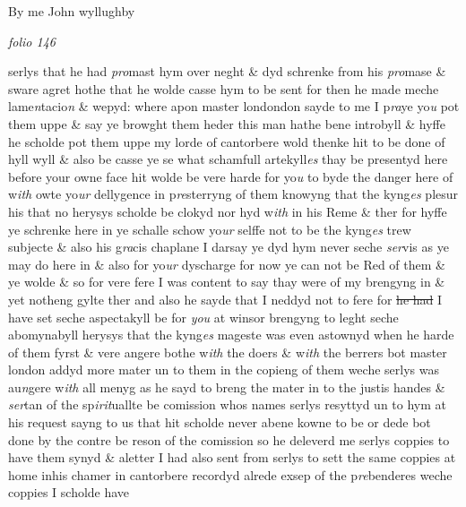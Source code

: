 \documentclass[12pt, a4paper]{book}
\begin{document}
		\ifthenelse{\isodd{\thepage}}
		{\reversemarginpar}
		{\normalmarginpar}
		By me John wyllughby

\dotfill
					

\textit{folio 146}



		\ifthenelse{\isodd{\thepage}}
		{\reversemarginpar}
		{\normalmarginpar}
		serlys that he had \textit{pro}mast hym over neght \& dyd schrenke from
 his \textit{pro}mase \& sware agret hothe that he wolde casse hym to be
 sent for then he made meche lame\textit{n}tacio\textit{n} \& wepyd: where apon
	master londondon sayde to me I p\textit{ra}ye yo\textit{u} pot them uppe \& say
 ye browght them heder this man hathe bene introbyll
 \& hyffe he scholde pot them uppe my lorde of cantorbere wold
 thenke hit to be done of hyll wyll \& also be casse ye se what
 schamfull artekyll\textit{es} thay be
			 presentyd here before your owne face
 hit wolde be vere harde for yo\textit{u} to byde the danger here of w\textit{ith}
 owte yo\textit{ur} dellygence in p\textit{re}sterryng of them knowyng that the
 kyng\textit{es }plesur his that no herysys scholde be clokyd nor hyd w\textit{ith} in
 his Reme \& ther for hyffe ye schrenke here in ye schalle schow
 yo\textit{ur} selffe not to be the kyng\textit{es} trew subjecte \& also his g\textit{ra}cis
 chaplane I darsay ye dyd hym never seche \textit{ser}vis as ye may
 do here in \& also for yo\textit{ur} dyscharge for now ye can not be Red
 of them \& ye wolde \& so for vere fere I was content to say
 thay were of my brengyng in \& yet notheng gylte ther
 and also he sayde that I neddyd not to fere for \sout{he had} I have
			 set seche
 aspectakyll be for \textit{you} at winsor brengyng to leght seche
 abomynabyll herysys that the kyng\textit{es} mageste was even
 astownyd when he harde of them fyrst \& vere angere bothe
 w\textit{ith} the doers \& w\textit{ith} the berrers bot master london addyd more
 mater un to them in the copieng of them weche serlys
 was au\textit{n}gere w\textit{ith} all menyg as he sayd to breng the
 mater in to the justis handes \& \textit{ser}tan of the sp\textit{irit}uallte
 be comission whos names serlys resyttyd un to hym at
 his request sayng to us that hit scholde never abene
 kowne to be or dede bot done by the contre be reson of
 the comission so he deleverd me serlys coppies to have them
 synyd \& aletter I had also sent from serlys to sett the
	same coppies at home inhis chamer in cantorbere recordyd
 alrede exsep of the p\textit{re}benderes weche coppies I scholde have
 	
\end{document}
